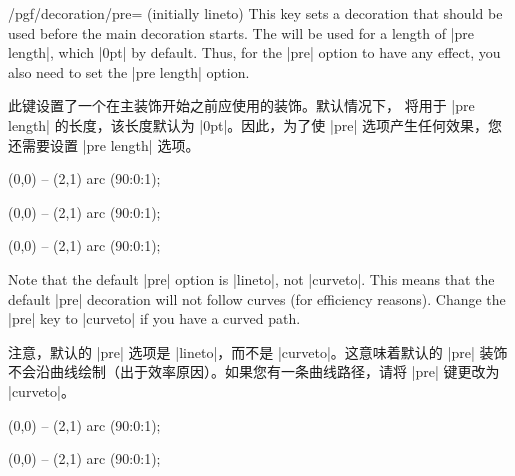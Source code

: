 \begin{key}{/pgf/decoration/pre= (initially lineto)}
    This key sets a decoration that should be used before the main decoration
    starts. The  will be used for a length of |pre length|,
    which |0pt| by default. Thus, for the |pre| option to have any effect, you
    also need to set the |pre length| option.

    此键设置了一个在主装饰开始之前应使用的装饰。默认情况下， 将用于 |pre length| 的长度，该长度默认为 |0pt|。因此，为了使 |pre| 选项产生任何效果，您还需要设置 |pre length| 选项。


\begin{codeexample}[preamble={\usetikzlibrary{decorations.pathmorphing}}]
\tikz [decoration={zigzag,pre=lineto,pre length=1cm}]
  \draw [decorate] (0,0) -- (2,1) arc (90:0:1);
\end{codeexample}
\begin{codeexample}[preamble={\usetikzlibrary{decorations.pathmorphing}}]
\tikz [decoration={zigzag,pre=moveto,pre length=1cm}]
  \draw [decorate] (0,0) -- (2,1) arc (90:0:1);
\end{codeexample}
\begin{codeexample}[preamble={\usetikzlibrary{
    decorations.pathmorphing,
    decorations.shapes,
}}]
\tikz [decoration={zigzag,pre=crosses,pre length=1cm}]
  \draw [decorate] (0,0) -- (2,1) arc (90:0:1);
\end{codeexample}

    Note that the default |pre| option is |lineto|, not |curveto|. This means
    that the default |pre| decoration will not follow curves (for efficiency
    reasons). Change the |pre| key to |curveto| if you have a curved path.
    
    注意，默认的 |pre| 选项是 |lineto|，而不是 |curveto|。这意味着默认的 |pre| 装饰不会沿曲线绘制（出于效率原因）。如果您有一条曲线路径，请将 |pre| 键更改为 |curveto|。


\begin{codeexample}[preamble={\usetikzlibrary{decorations.pathmorphing}}]
\tikz [decoration={zigzag,pre length=3cm}]
  \draw [decorate] (0,0) -- (2,1) arc (90:0:1);
\end{codeexample}
\begin{codeexample}[preamble={\usetikzlibrary{decorations.pathmorphing}}]
\tikz [decoration={zigzag,pre=curveto,pre length=3cm}]
  \draw [decorate] (0,0) -- (2,1) arc (90:0:1);
\end{codeexample}
\end{key}

